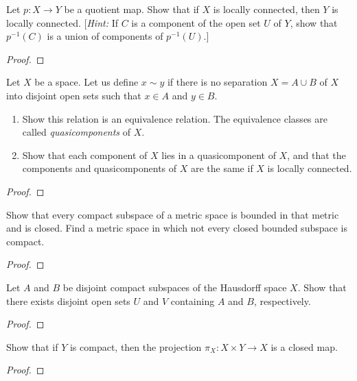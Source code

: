 \begin{problem}[Munkres \S25, Ex.\,8]
Let $p\colon X\to Y$ be a quotient map. Show that if $X$ is
locally connected, then $Y$ is locally connected. [\emph{Hint:}
If $C$ is a component of the open set $U$ of $Y$, show that
$p^{-1}(C)$ is a union of components of $p^{-1}(U)$.]
\end{problem}
\begin{proof}

\end{proof}
\newpage
\begin{problem}[Munkres \S25, Ex.\,10(a,b)]
Let $X$ be a space. Let us define $x\sim y$ if there is no
separation $X=A\cup B$ of $X$ into disjoint open sets such that
$x\in A$ and $y\in B$.
\begin{enumerate}[noitemsep,label=(\alph*)]
\item Show this relation is an equivalence relation. The
  equivalence classes are called \emph{quasicomponents} of $X$.
\item Show that each component of $X$ lies in a quasicomponent of
  $X$, and that the components and quasicomponents of $X$ are the
  same if $X$ is locally connected.
\end{enumerate}
\end{problem}
\begin{proof}
\end{proof}
\newpage
\begin{problem}[Munkres \S26, Ex.\,4]
Show that every compact subspace of a metric space is bounded in
that metric and is closed. Find a metric space in which not every
closed bounded subspace is compact.
\end{problem}
\begin{proof}
\end{proof}
\newpage
\begin{problem}[Munkres \S26, Ex.\,5]
Let $A$ and $B$ be disjoint compact subspaces of the Hausdorff
space $X$. Show that there exists disjoint open sets $U$ and $V$
containing $A$ and $B$, respectively.
\end{problem}
\begin{proof}
\end{proof}
\newpage
\begin{problem}[Munkres \S26, Ex.\,7]
Show that if $Y$ is compact, then the projection $\pi_X\colon
X\times Y\to X$ is a closed map.
\end{problem}
\begin{proof}
\end{proof}
\newpage
